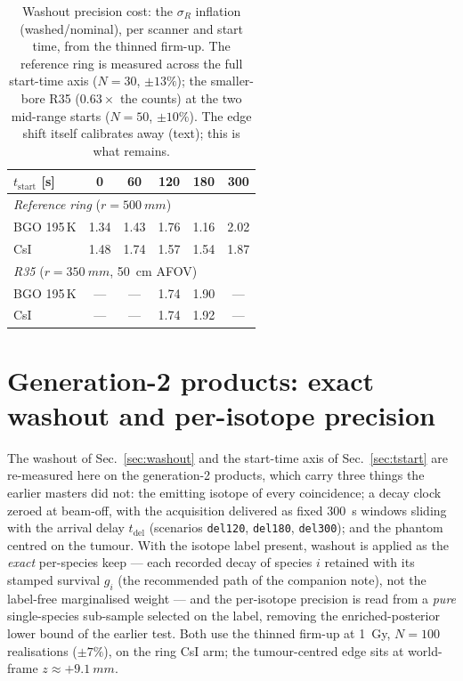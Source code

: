 \documentclass[11pt]{article}
\begin{document}
\begin{table}[htb]
  \centering
  \caption{Washout precision cost: the $\sigma_R$ inflation (washed/nominal),
    per scanner and start time, from the thinned firm-up. The reference ring is
    measured across the full start-time axis ($N=30$, $\pm13\%$); the
    smaller-bore R35 ($0.63\times$ the counts) at the two mid-range starts
    ($N=50$, $\pm10\%$). The edge shift itself calibrates away (text); this is
    what remains.}
  \label{tab:washout}
  \vspace{1mm}
  \begin{tabular}{lccccc}
    \toprule
    {$t_{\text{start}}$ [s]} & {0} & {60} & {120} & {180} & {300} \\
    \midrule
    \multicolumn{6}{l}{\emph{Reference ring} ($r=\SI{500}{mm}$)}\\
    BGO 195\,K & 1.34 & 1.43 & 1.76 & 1.16 & 2.02 \\
    CsI        & 1.48 & 1.74 & 1.57 & 1.54 & 1.87 \\
    \midrule
    \multicolumn{6}{l}{\emph{R35} ($r=\SI{350}{mm}$, \SI{50}{cm} AFOV)}\\
    BGO 195\,K & --- & --- & 1.74 & 1.90 & --- \\
    CsI        & --- & --- & 1.74 & 1.92 & --- \\
    \bottomrule
  \end{tabular}
\end{table}

\section{Generation-2 products: exact washout and per-isotope precision}
\label{sec:v2}

The washout of Sec.~\ref{sec:washout} and the start-time axis of
Sec.~\ref{sec:tstart} are re-measured here on the generation-2 products, which
carry three things the earlier masters did not: the emitting isotope of every
coincidence; a decay clock zeroed at beam-off, with the acquisition delivered as
fixed \SI{300}{s} windows sliding with the arrival delay $t_{\text{del}}$
(scenarios \texttt{del120}, \texttt{del180}, \texttt{del300}); and the phantom
centred on the tumour. With the isotope label present, washout is applied as the
\emph{exact} per-species keep --- each recorded decay of species $i$ retained
with its stamped survival $g_i$ (the recommended path of the companion note),
not the label-free marginalised weight --- and the per-isotope precision is read
from a \emph{pure} single-species sub-sample selected on the label, removing the
enriched-posterior lower bound of the earlier test. Both use the thinned firm-up
at \SI{1}{Gy}, $N = 100$ realisations ($\pm7\%$), on the ring CsI arm; the
tumour-centred edge sits at world-frame $z \approx +\SI{9.1}{mm}$.
\end{document}
